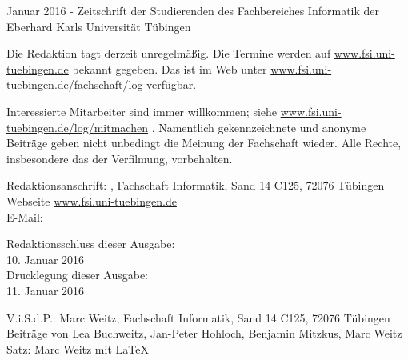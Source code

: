 \nameit \space \space Januar 2016 - Zeitschrift der Studierenden des Fachbereiches Informatik der Eberhard Karls Universität Tübingen

Die Redaktion tagt derzeit unregelmäßig. Die Termine werden auf \url{www.fsi.uni-tuebingen.de} bekannt  gegeben.  Das  \nameit \space ist  im  Web  unter \url{www.fsi.uni-tuebingen.de/fachschaft/log} verfügbar.

Interessierte Mitarbeiter sind immer willkommen; 
siehe \url{www.fsi.uni-tuebingen.de/log/mitmachen}
.
Namentlich gekennzeichnete und anonyme Beiträge geben nicht unbedingt die Meinung der Fachschaft wieder. Alle Rechte, insbesondere das der Verfilmung, vorbehalten.

Redaktionsanschrift:
\nameit, Fachschaft Informatik, Sand 14 C125, 72076 Tübingen\\
Webseite \url{www.fsi.uni-tuebingen.de}\\
E-Mail:

Redaktionsschluss dieser Ausgabe:\\
10. Januar 2016\\
Drucklegung dieser Ausgabe:\\
11. Januar 2016

V.i.S.d.P.: Marc Weitz, Fachschaft Informatik, Sand 14 C125, 72076 Tübingen\\
Beiträge von Lea Buchweitz, Jan-Peter Hohloch, Benjamin Mitzkus, Marc Weitz\\
Satz: Marc Weitz mit \LaTeX 


